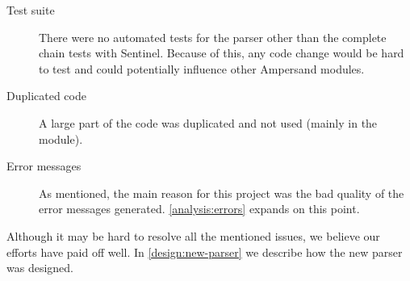 \begin{description}
  \item[Test suite]
    There were no automated tests for the parser other than the complete chain tests with Sentinel.
    Because of this, any code change would be hard to test and could potentially influence other Ampersand modules.
  
  \item[Duplicated code]
    A large part of the code was duplicated and not used (mainly in the  module).
  
  \item[Error messages]
    As mentioned, the main reason for this project was the bad quality of the error messages generated.
    \autoref{analysis:errors} expands on this point.
\end{description}
%
Although it may be hard to resolve all the mentioned issues, we believe our efforts have paid off well.
In \autoref{design:new-parser} we describe how the new parser was designed.
